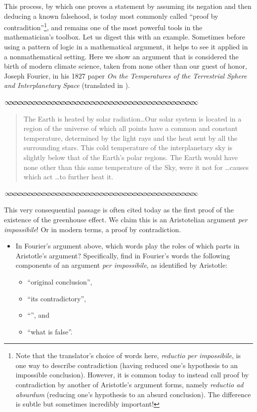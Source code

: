\documentclass[11pt]{article}
\newcommand{\sep}{\vspace{-3pt}
\begin{center}
{\mathversion{normal}
$\infty \mspace{-5.5mu}\infty \mspace{-5.5mu}\infty \mspace{-5.5mu}\infty \mspace{-5.5mu}
\infty \mspace{-5.5mu}\infty \mspace{-5.5mu}\infty \mspace{-5.5mu}\infty \mspace{-5.5mu}
\infty \mspace{-5.5mu}\infty \mspace{-5.5mu}\infty \mspace{-5.5mu}\infty \mspace{-5.5mu}
\infty \mspace{-5.5mu}\infty \mspace{-5.5mu}\infty \mspace{-5.5mu}\infty \mspace{-5.5mu}
\infty \mspace{-5.5mu}\infty \mspace{-5.5mu}\infty \mspace{-5.5mu}\infty \mspace{-5.5mu}
\infty \mspace{-5.5mu}\infty \mspace{-5.5mu}\infty \mspace{-5.5mu}\infty \mspace{-5.5mu}
\infty \mspace{-5.5mu}\infty \mspace{-5.5mu}\infty \mspace{-5.5mu}\infty \mspace{-5.5mu}
\infty \mspace{-5.5mu}\infty \mspace{-5.5mu}\infty \mspace{-5.5mu}\infty \mspace{-5.5mu}
\infty \mspace{-5.5mu}\infty \mspace{-5.5mu}\infty \mspace{-5.5mu}\infty \mspace{-5.5mu}
\infty \mspace{-5.5mu}\infty \mspace{-5.5mu}\infty \mspace{-5.5mu}\infty \mspace{-5.5mu}$}
\end{center} \vspace*{-5pt}}
\newenvironment{source}%
 {\bigskip \sep \vspace*{-6pt} \begin{quote}
          \begin{sf}   }
   {   \end{sf}     \end{quote} \vspace*{-6pt} \sep \bigskip}%
\newcounter{tasknumb}
\newcommand{\tasknumb}[1]{\refstepcounter{tasknumb}\textmd{\textbf{$\fbox{$\fbox{Task \thetasknumb}$}$}}#1}
\newenvironment{task}[1][]%
 {\begin{itemize}
 \item[\tasknumb{#1}]  }
{
    \end{itemize}    }%
\begin{document}
This process, by which one proves a statement by assuming its negation and then deducing a known falsehood, is today most commonly called ``proof by contradition''\footnote{Note that the translator's choice of words here, \emph{reductio per impossibile}, is one way to describe contradiction (having reduced one's hypothesis to an impossible conclusion). However, it is common today to instead call proof by contradiction by another of Aristotle's argument forms, namely \emph{reductio ad absurdum} (reducing one's hypothesis to an absurd conclusion).  The difference is subtle but sometimes incredibly important!}, and remains one of the most powerful tools in the mathematician's toolbox.  Let us digest this with an example.
 Sometimes before using a pattern of logic in a mathematical argument, it helps to see it applied in a nonmathematical setting.  Here we show an argument that is considered the birth of modern climate science, taken from none other than our guest of honor, Joseph Fourier, in his 1827 paper \emph{On the Temperatures of the Terrestrial Sphere and Interplanetary Space} (translated in  \citep{Pierrehumbert}).

\begin{source}
The Earth is heated by solar radiation\ldots Our solar system is located in a region of the universe of which all points have
a common and constant temperature, determined by the light rays and the heat sent by all the surrounding stars. This cold temperature of the interplanetary
sky is slightly below that of the Earth's polar regions.  The Earth would have
none other than this same temperature of the Sky, were it not for \ldots causes
which act \ldots to further heat it.
\end{source}

This very consequential passage is often cited today as the first proof of the existence of the greenhouse effect.  We claim this is an Aristotelian argument \emph{per impossibile}!  Or in modern terms, a proof by contradiction. 

\begin{task} In Fourier's argument above, which words play the roles of which parts in Aristotle's argument?  Specifically, find in Fourier's words the following components of an argument \emph{per impossibile}, as identified by Aristotle:
    \begin{itemize}
        \item ``{\sf original conclusion}'',
        \item ``{\sf its contradictory}'',
        \item ``{}'', and
        \item ``{\sf what is false}''.
    \end{itemize}
\end{task}
\end{document}
